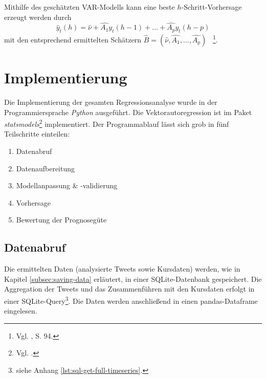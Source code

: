 \documentclass[
	a4paper,
	12pt,
	bibliography=totocnumbered,
	twoside,
]{scrreprt}
\begin{document}
Mithilfe des geschätzten VAR-Modells kann eine beste $h$-Schritt-Vorhersage erzeugt werden durch
\begin{equation}
	\hat{y}_t(h) = \hat{\nu} + \hat{A_1} y_t (h-1) + \ldots + \hat{A_p} y_t (h-p)
\end{equation}
mit den entsprechend ermittelten Schätzern $\hat{B} = (\hat{\nu}, \hat{A_1}, \ldots, \hat{A_p})$ \ \footnote{Vgl. \citet{luetkepohl2005}, S. 94.}.\\



\section{Implementierung}
Die Implementierung der gesamten Regressionsanalyse wurde in der Programmiersprache \textit{Python} ausgeführt. Die Vektorautoregression ist im Paket \textit{statsmodels}\footnote{Vgl. \citet{statsmodels}.} implementiert. Der Programmablauf lässt sich grob in fünf Teilschritte einteilen:
\begin{enumerate}
    \item Datenabruf
    \item Datenaufbereitung
    \item Modellanpassung \& -validierung
    \item Vorhersage
    \item Bewertung der Prognosegüte
\end{enumerate}


\subsection*{Datenabruf}
Die ermittelten Daten (analysierte Tweets sowie Kursdaten) werden, wie in Kapitel \ref{subsec:saving-data} erläutert, in einer SQLite-Datenbank gespeichert. Die Aggregation der Tweets und das Zusammenführen mit den Kursdaten erfolgt in einer SQLite-Query\footnote{siehe Anhang \ref{lst:sql-get-full-timeseries}.}. Die Daten werden anschließend in einen pandas-Dataframe eingelesen.


\end{document}

